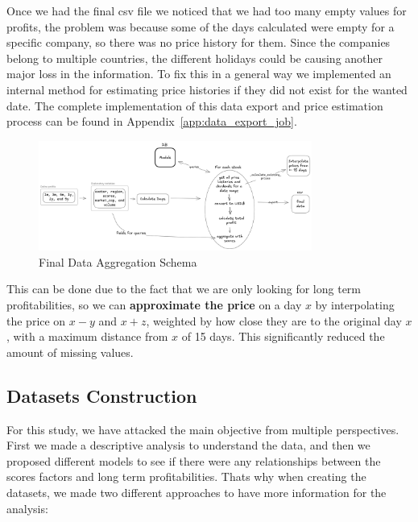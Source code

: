 \documentclass[11pt,english,a4paper,hidelinks]{book}
\begin{document}
\noindent Once we had the final csv file we noticed that we had too many empty values for profits, the problem was because some of the days calculated were empty for a specific company, so there was no price history for them. Since the companies belong to multiple countries, the different holidays could be causing another major loss in the information. To fix this in a general way we implemented an internal method for estimating price histories if they did not exist for the wanted date. The complete implementation of this data export and price estimation process can be found in Appendix~\ref{app:data_export_job}.

\begin{figure}[H]
    \centering
    \includegraphics[width=0.8\textwidth]{images/tweenvest/Final Data Aggregation Schema.png}
    \caption{Final Data Aggregation Schema}
    \label{fig:final_data_aggregation_schema}
\end{figure}

\noindent This can be done due to the fact that we are only looking for long term profitabilities, so we can \textbf{approximate the price} on a day $x$ by interpolating the price on $x-y$ and $x+z$, weighted by how close they are to the original day $x$, with a maximum distance from $x$ of 15 days. This significantly reduced the amount of missing values.

\subsection{Datasets Construction}

For this study, we have attacked the main objective from multiple perspectives. First we made a descriptive analysis to understand the data, and then we proposed different models to see if there were any relationships between the scores factors and long term profitabilities. Thats why when creating the datasets, we made two different approaches to have more information for the analysis:
\end{document}
